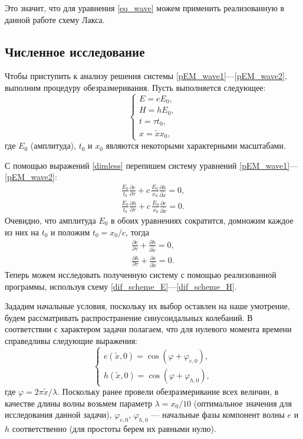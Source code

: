 \documentclass[12pt,a4paper]{article}
\begin{document}
	Это значит, что для уравнения \eqref{eq_wave} можем применить реализованную в данной работе схему Лакса.
	
	\subsection{Численное исследование}
	Чтобы приступить к анализу решения системы \eqref{pEM_wave1}---\eqref{pEM_wave2}, выполним процедуру обезразмеривания. Пусть выполняется следующее:
	\begin{equation}\label{dimless}
		\begin{cases}
			E = e E_0, \\
			H = h E_0, \\
			t = \tau t_0, \\
			x = \widetilde{x} x_0,
		\end{cases}
	\end{equation}
	где $E_0$ (амплитуда), $t_0$ и $x_0$ являются некоторыми характерными масштабами.
	
	С помощью выражений \eqref{dimless} перепишем систему уравнений \eqref{pEM_wave1}---\eqref{pEM_wave2}:
	\begin{align}
		\frac{E_0}{t_0}\frac{\partial e}{\partial \tau} + c\,\frac{E_0}{x_0}\frac{\partial h}{\partial \widetilde{x}} = 0,\\
		\frac{E_0}{t_0}\frac{\partial h}{\partial \tau} + c\,\frac{E_0}{x_0}\frac{\partial e}{\partial \widetilde{x}} = 0.
	\end{align}
	Очевидно, что амплитуда $E_0$ в обоих уравнениях сократится, домножим каждое из них на $t_0$ и положим $t_0 = x_0 / c$, тогда
	\begin{align}
		\frac{\partial e}{\partial \tau} + \frac{\partial h}{\partial \widetilde{x}} = 0,\\
		\frac{\partial h}{\partial \tau} + \frac{\partial e}{\partial \widetilde{x}} = 0.
	\end{align}
	Теперь можем исследовать полученную систему с помощью реализованной программы, используя схему \eqref{dif_scheme_E}---\eqref{dif_scheme_H}.
	
	Зададим начальные условия, поскольку их выбор оставлен на наше умотрение, будем рассматривать распространение синусоидальных колебаний. В соответствии с характером задачи полагаем, что для нулевого момента времени справедливы следующие выражения:
	\begin{equation}
		\begin{cases}
			e(\widetilde{x},0) = \cos{(\varphi + \varphi_{e,0})},\\
			h(\widetilde{x},0) = \cos{(\varphi + \varphi_{h,0})},
		\end{cases}
	\end{equation}
	где $\varphi = 2\pi \widetilde{x} / \lambda$. Поскольку ранее провели обезразмеривание всех величин, в качестве длины волны возьмем параметр $\lambda = x_0 / 10$ (оптимальное значения для исследования данной задачи), $\varphi_{e,0}$, $\varphi_{h,0}$ --- начальные фазы компонент волны $e$ и $h$ соответственно (для простоты берем их равными нулю).
	
\end{document}
